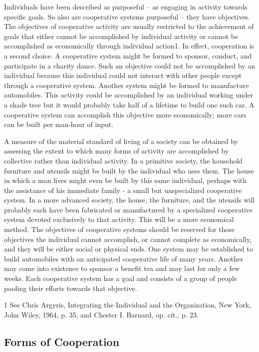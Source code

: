Individuals have been described as purposeful – as engaging in activity towards specific goals. So also are cooperative systems purposeful – they have objectives. The objectives of cooperative activity are usually restricted to the achievement of goals that either cannot be accomplished by individual activity or cannot be accomplished as economically through individual action1. In effect, cooperation is a second choice. A cooperative system might be formed to sponsor, conduct, and participate in a charity dance. Such an objective could not be accomplished by an individual because this individual could not interact with other people except through a cooperative system. Another system might be formed to manufacture automobiles. This activity could be accomplished by an individual working under a shade tree but it would probably take half of a lifetime to build one such car. A cooperative system can accomplish this objective more economically; more cars can be built per man-hour of input.

A measure of the material standard of living of a society can be obtained by assessing the extent to which many forms of activity are accomplished by collective rather than individual activity. In a  primitive society, the household furniture and utensils might be built by the individual who uses them. The house in which a man lives might even be built by this same individual, perhaps with the assistance of his immediate family - a small but unspecialized cooperative system. In a more advanced society, the house, the furniture, and the utensils will probably each have been fabricated or manufactured by a specialized cooperative system devoted exclusively to that activity. This will be a more economical method. The objectives of cooperative systems should be reserved for those objectives the individual cannot accomplish, or cannot complete as economically, and they will be either social or physical ends. One system may be established to build automobiles with an anticipated cooperative life of many years. Another may come into existence to sponsor a benefit tea and may last for only a few weeks. Each cooperative system has a goal and consists of a group of people pooling their efforts towards that objective.

1 See Chris Argyris, Integrating the Individual and the Organization, New York, John Wiley, 1964, p. 35, and Chester I. Barnard, op. cit., p. 23.

\subsection{Forms of Cooperation}

